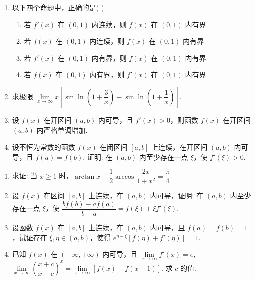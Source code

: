 \newpage

\begin{enumerate}[label=\textbf{\arabic*.}, itemsep=4.5cm, resume]

    \item 以下四个命题中，正确的是( )
    \begin{enumerate}
        \item 若 $f'(x)$ 在 $(0,1)$ 内连续，则 $f(x)$ 在 $(0,1)$ 内有界
        \item 若 $f(x)$ 在 $(0,1)$ 内连续，则 $f(x)$ 在 $(0,1)$ 内有界
        \item 若 $f'(x)$ 在 $(0,1)$ 内有界，则 $f(x)$ 在 $(0,1)$ 内有界
        \item 若 $f(x)$ 在 $(0,1)$ 内有界，则 $f'(x)$ 在 $(0,1)$ 内有界
    \end{enumerate}

    \item 求极限 $\lim\limits_{x \to \infty} x\left[\sin\ln\left(1+\dfrac{3}{x}\right) - \sin\ln\left(1+\dfrac{1}{x}\right)\right]$.
    
    \item 设 $f(x)$ 在开区间 $(a,b)$ 内可导，且 $f'(x) > 0$，则函数 $f(x)$ 在开区间 $(a,b)$ 内严格单调增加.
    
    \item 设不恒为常数的函数 $f(x)$ 在闭区间 $[a,b]$ 上连续，在开区间 $(a,b)$ 内可导，且 $f(a) = f(b)$. 证明: 在 $(a,b)$ 内至少存在一点 $\xi$，使 $f'(\xi) > 0$.
    
\end{enumerate}

\newpage

\begin{enumerate}[label=\textbf{\arabic*.}, itemsep=7cm, resume]

    \item 求证: 当 $x \ge 1$ 时，$\arctan x - \dfrac{1}{2}\arccos\dfrac{2x}{1+x^2} = \dfrac{\pi}{4}$.
    
    \item 设 $f(x)$ 在区间 $[a,b]$ 上连续，在 $(a,b)$ 内可导，证明: 在 $(a,b)$ 内至少存在一点 $\xi$，使 $\dfrac{bf(b) - af(a)}{b - a} = f(\xi) + \xi f'(\xi)$.
    
    \item 设函数 $f(x)$ 在 $[a,b]$ 上连续，在 $(a,b)$ 内可导，且 $f(a) = f(b) = 1$，试证存在 $\xi, \eta \in (a,b)$，使得 $e^{\eta - \xi}[f(\eta) + f'(\eta)] = 1$.
    
    \item 已知 $f(x)$ 在 $(-\infty,+\infty)$ 内可导，且 $\lim\limits_{x \to \infty} f'(x) = e$, $\lim\limits_{x \to \infty} \left(\dfrac{x+c}{x-c}\right)^x = \lim\limits_{x \to \infty} [f(x) - f(x-1)]$. 求 $c$ 的值.
    
\end{enumerate}

